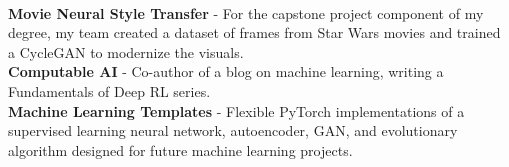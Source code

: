 \documentclass{article}
\begin{document}
\begin{center}
\begin{flushleft}
    {\large\textbf{\underline{}}} \\
    \textbf{Movie Neural Style Transfer} - For the capstone project component of my degree, my team created a dataset of frames from Star Wars movies and trained a CycleGAN to modernize the visuals. \\
    \textbf{Computable AI} - Co-author of a blog on machine learning, writing a Fundamentals of Deep RL series. \\
    \textbf{Machine Learning Templates} - Flexible PyTorch implementations of a supervised learning neural network, autoencoder, GAN, and evolutionary algorithm designed for future machine learning projects. \\

  \end{flushleft}
\end{center}
\end{document}
